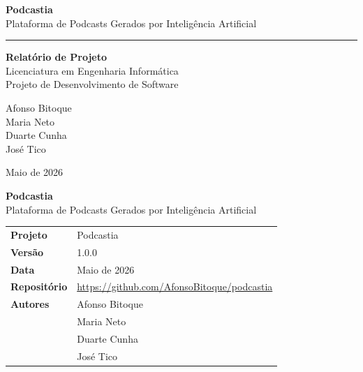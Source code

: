\documentclass[12pt, a4paper]{report}
\begin{document}
\begin{titlepage}
  \pagecolor{primary}
  \color{white}
  \centering
  \vspace*{3cm}

  {\fontsize{48}{56}\selectfont\bfseries Podcastia}\\[0.4cm]
  {\large\color{accent} Plataforma de Podcasts Gerados por Inteligência Artificial}

  \vspace{2cm}
  \rule{10cm}{1pt}
  \vspace{1.5cm}

  {\large\bfseries Relatório de Projeto}\\[0.5cm]
  {\normalsize Licenciatura em Engenharia Informática}\\[0.2cm]
  {\normalsize Projeto de Desenvolvimento de Software}

  \vspace{2.5cm}

  {\large
    Afonso Bitoque\\[0.3cm]
    Maria Neto\\[0.3cm]
    Duarte Cunha\\[0.3cm]
    José Tico
  }

  \vfill
  {\normalsize Maio de 2026}
  \vspace{1cm}
\end{titlepage}
\nopagecolor

\newpage
\thispagestyle{empty}
\vspace*{2cm}

\begin{center}
  {\LARGE\bfseries\color{primary} Podcastia}\\[0.3cm]
  {\large Plataforma de Podcasts Gerados por Inteligência Artificial}\\[2cm]

  \begin{tabular}{ll}
    \toprule
    \textbf{Projeto}      & Podcastia \\
    \textbf{Versão}       & 1.0.0 \\
    \textbf{Data}         & Maio de 2026 \\
    \textbf{Repositório}  & \url{https://github.com/AfonsoBitoque/podcastia} \\
    \midrule
    \textbf{Autores}      & Afonso Bitoque \\
                          & Maria Neto \\
                          & Duarte Cunha \\
                          & José Tico \\
    \bottomrule
  \end{tabular}
\end{center}
\end{document}

